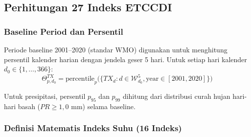 \documentclass[12pt, a4paper]{article}
\begin{document}
\subsection{Perhitungan 27 Indeks ETCCDI}

\subsubsection{Baseline Period dan Persentil}

Periode baseline 2001--2020 (standar WMO) digunakan untuk menghitung persentil kalender harian dengan jendela geser 5 hari. Untuk setiap hari kalender $d_0 \in \{1, \ldots, 366\}$:
\begin{equation}
  \Theta^{TX}_{p,d_0} = \text{percentile}_p\bigl(\{TX_{d} : d \in \mathcal{W}_{d_0}^{5}, \text{year} \in [2001, 2020]\}\bigr)
\end{equation}

Untuk presipitasi, persentil $p_{95}$ dan $p_{99}$ dihitung dari distribusi curah hujan hari-hari basah ($PR \geq 1{,}0$ mm) selama baseline.

\subsubsection{Definisi Matematis Indeks Suhu (16 Indeks)}
\end{document}

